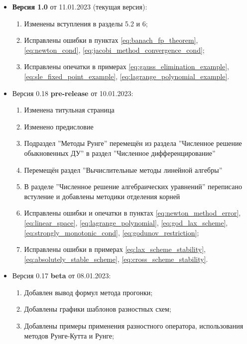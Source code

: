 \documentclass{article}
\begin{document}

\begin{itemize}[nosep]
\item \textbf{Версия 1.0} от 11.01.2023 (текущая версия):
	\begin{enumerate}[nosep]
		\item Изменены вступления в разделы 5.2 и 6;
		\item Исправлены ошибки в пунктах
			\eqref{eq:banach_fp_theorem},
			\eqref{eq:newton_cond},
			\eqref{eq:jacobi_method_convergence_cond};
		\item Исправлены опечатки в примерах
			\eqref{eq:gauss_elimination_example},
			\eqref{eq:sle_fixed_point_example},
			\eqref{eq:lagrange_polynomial_example}.
	\end{enumerate}
\item Версия 0.18 \textbf{pre-release} от 10.01.2023:
	\begin{enumerate}[nosep]
		\item Изменена титульная страница
		\item Изменено предисловие
		\item Подраздел ''Методы Рунге'' перемещён из раздела
			''Численное решение обыкновенных ДУ'' в раздел
			''Численное дифференцирование''
		\item Перемещён раздел ''Вычислительные методы линейной
			алгебры''
		\item В разделе ''Численное решение алгебраических уравнений''
			переписано встуление и добавлены методики отделения
			корней
		\item Исправлены ошибки и опечатки в пунктах
			\eqref{eq:newton_method_error},
			\eqref{eq:linear_space},
			\eqref{eq:lagrange_polynomial}, 
			\eqref{eq:god_lax_scheme},
			\eqref{eq:strongly_monotonic_cond},
			\eqref{eq:godunov_restriction};
		\item Исправлены ошибки в примерах
			\eqref{eq:lax_scheme_stability},
			\eqref{eq:absolutely_stable_scheme},
			\eqref{eq:cross_scheme_stability}.
	\end{enumerate}
\item Версия 0.17 \textbf{beta} от 08.01.2023:
	\begin{enumerate}[nosep]
		\item Добавлен вывод формул метода прогонки;
		\item Добавлены графики шаблонов разностных схем;
		\item Добавлены примеры применения разностного оператора,
			использования методов Рунге-Кутта и Рунге;

\end{enumerate}
\end{itemize}
\end{document}
